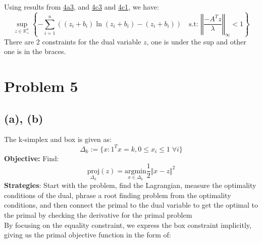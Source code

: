 \documentclass[]{article}
\begin{document}
        Using results from \hyperref[eqn:4a3]{4a3}, and \hyperref[eqn:4c3]{4c3} and \hyperref[eqn:4c1]{4c1}, we have: 
        \begin{equation*}\tag{4c4}\label{eqn:4c4}
            \sup_{z\in \mathbb{R}_+^n}
            \left\lbrace
                - \sum_{i = 1}^{n}\left(
                    (z_i + b_i)\ln(z_i + b_i) - (z_i + b_i)
                \right)
                \quad \text{s.t: } 
                \left\Vert
                    \frac{-A^Tz}{\lambda}    
                \right\Vert_\infty < 1
            \right\rbrace
        \end{equation*}
        There are 2 constraints for the dual variable $z$, one is under the sup and other one is in the braces. 
\section*{Problem 5}
    \subsection*{(a), (b)}
        The k-simplex and box is given as: 
        $$
        \Delta_k := \{ 
            x: 1^Tx = k, 0\le x_i \le 1 \;\forall i
        \}
        $$  
        \textbf{Objective: }
        Find: 
        $$
        \underset{\Delta_k}{\text{proj}}(z) = \underset{x \in \Delta_k}
        {\text{argmin}}
        \frac{1}{2}\Vert x - z\Vert^2
        $$
        \textbf{Strategies}: Start with the problem, find the Lagrangian, measure the optimality conditions of the dual, phrase a root finding problem from the optimality conditions, and then connect the primal to the dual variable to get the optimal to the primal by checking the derivative for the primal problem \\
        By focusing on the equality constraint, we express the box constraint implicitly, giving us the primal objective function in the form of: 
\end{document}
